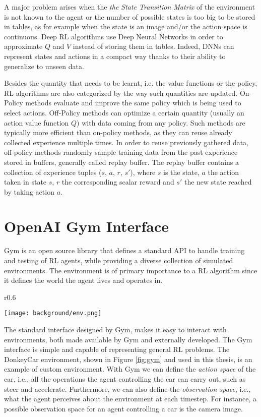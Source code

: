 A major problem arises when the \textit{the State Transition Matrix} of the environment is not known to the agent or the number of possible states is too big to be stored in tables, as for example when the state is an image and/or the action space is continuous. Deep RL algorithms use Deep Neural Networks in order to approximate $Q$ and $V$ instead of storing them in tables. Indeed, DNNs can represent states and actions in a compact way thanks to their ability to generalize to unseen data. 

Besides the quantity that needs to be learnt, i.e. the value functions or the policy, RL algorithms are also categorized by the way such quantities are updated. On-Policy methods evaluate and improve the same policy which is being used to select actions. Off-Policy methods can optimize a certain quantity (usually an action value function $Q$) with data coming from any policy. Such methods are typically more efficient than on-policy methods, as they can reuse already collected experience multiple times. In order to reuse previously gathered data, off-policy methods randomly sample training data from the past experience stored in buffers, generally called replay buffer. The replay buffer contains a collection of experience tuples ($s$, $a$, $r$, $s'$), where $s$ is the state, $a$ the action taken in state $s$, $r$ the corresponding scalar reward and $s'$ the new state reached by taking action $a$.

\section{OpenAI Gym Interface}

Gym is an open source library that defines a standard API to handle training and testing of RL agents, while providing a diverse collection of simulated environments. The environment is of primary importance to a RL algorithm since it defines the world the agent lives and operates in. 

\begin{wrapfigure}{r}{0.6\textwidth}
  \begin{center}
    \texttt{[image: background/env.png]}
  \end{center}
  \caption{DonkeyCar environment}
  \label{fig:gym}
\end{wrapfigure}

The standard interface designed by Gym, makes it easy to interact with environments, both made available by Gym and externally developed. The Gym interface is simple and capable of representing general RL problems. The DonkeyCar environment, shown in Figure \ref{fig:gym} and used in this thesis, is an example of custom environment. With Gym we can define the \textit{ action space} of the car, i.e., all the operations the agent controlling the car can carry out, such as steer and accelerate. Furthermore, we can also define the \textit{observation space}, i.e., what the agent perceives about the environment at each timestep. For instance, a possible observation space for an agent controlling a car is the camera image.

